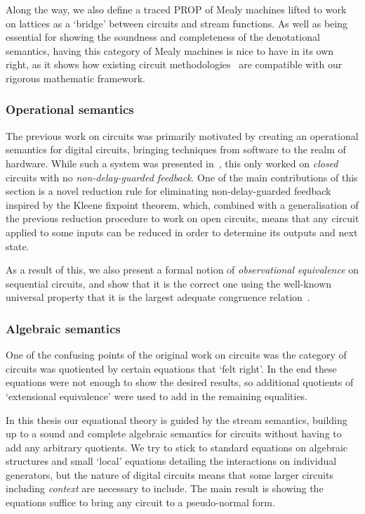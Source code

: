 Along the way, we also define a traced PROP of Mealy machines lifted to work on
lattices as a `bridge' between circuits and stream functions.
As well as being essential for showing the soundness and completeness of the
denotational semantics, having this category of Mealy machines is nice to have
in its own right, as it shows how existing circuit
methodologies~\cite{kohavi2009switching} are compatible with our rigorous
mathematic framework.

\subsubsection{Operational semantics}

The previous work on circuits was primarily motivated by creating an operational
semantics for digital circuits, bringing techniques from software to the realm
of hardware.
While such a system was presented in~\cite{ghica2017diagrammatic}, this only
worked on \emph{closed} circuits with no \emph{non-delay-guarded feedback}.
One of the main contributions of this section is a novel reduction rule for
eliminating non-delay-guarded feedback inspired by the Kleene fixpoint theorem,
which, combined with a generalisation of the previous reduction procedure to
work on open circuits, means that any circuit applied to some inputs can be
reduced in order to determine its outputs and next state.

As a result of this, we also present a formal notion of
\emph{observational equivalence} on sequential circuits, and show that it is the
correct one using the well-known universal property that it is the largest
adequate congruence relation~\cite{gordon1998operational}.

\subsubsection{Algebraic semantics}

One of the confusing points of the original work on circuits was the category
of circuits was quotiented by certain equations that `felt right'.
In the end these equations were not enough to show the desired results,
so additional quotients of `extensional equivalence' were used to add in the
remaining equalities.

In this thesis our equational theory is guided by the stream semantics,
building up to a sound and complete algebraic semantics for circuits without
having to add any arbitrary quotients.
We try to stick to standard equations on algebraic structures and small `local'
equations detailing the interactions on individual generators, but the nature of
digital circuits means that some larger circuits including \emph{context} are
necessary to include.
The main result is showing the equations suffice to bring any circuit to a
pseudo-normal form.

